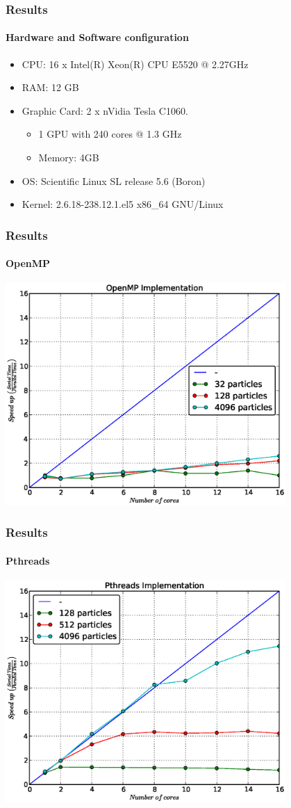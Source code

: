 \frame
{
\frametitle{Results}
\framesubtitle{Hardware and Software configuration}
\begin{itemize}
    \item CPU: 16 x Intel(R) Xeon(R) CPU E5520  @ 2.27GHz
    \item RAM: 12 GB
    \item Graphic Card: 2 x nVidia Tesla C1060.
    \begin{itemize}
        \item 1 GPU with 240 cores @ 1.3 GHz
        \item Memory: 4GB
    \end{itemize}
    \item OS: Scientific Linux SL release 5.6 (Boron)
    \item Kernel: 2.6.18-238.12.1.el5 x86\_64 GNU/Linux
\end{itemize}
}


\frame
{
\frametitle{Results}
\framesubtitle{OpenMP}
\begin{center}
    \includegraphics[width=0.8\textwidth]{img/openmp}
\end{center}
}

\frame
{
\frametitle{Results}
\framesubtitle{Pthreads}
\begin{center}
    \includegraphics[width=0.8\textwidth]{img/pthreads}
\end{center}
}

